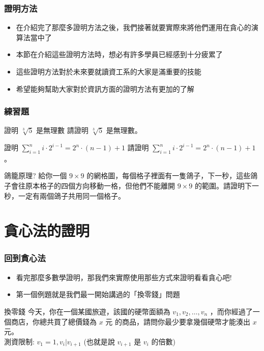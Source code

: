 \documentclass[aspectratio=169]{beamer}
\begin{document}
\begin{frame}
\frametitle{證明方法}
    \begin{itemize}
        \item 在介紹完了那麼多證明方法之後，我們接著就要實際來將他們運用在貪心的演算法當中了
        \item 本節在介紹這些證明方法時，想必有許多學員已經感到十分疲累了
        \item 這些證明方法對於未來要就讀資工系的大家是滿重要的技能
        \item 希望能夠幫助大家對於資訊方面的證明方法有更加的了解
    \end{itemize}
\end{frame}

\begin{frame}
\frametitle{練習題}
    \begin{block}{證明 $\sqrt[3]{5}$ 是無理數}
        請證明 $\sqrt[3]{5}$ 是無理數。
    \end{block}
    
    \begin{block}{證明 $\sum_{i=1}^n i \cdot 2^{i-1} = 2^n \cdot (n-1) + 1$}
        請證明 $\sum_{i=1}^n i \cdot 2^{i-1} = 2^n \cdot (n-1) + 1$。
    \end{block}
    
    \begin{block}{鴿籠原理?}
        給你一個 $9 \times 9$ 的網格圖，每個格子裡面有一隻鴿子，下一秒，這些鴿子會往原本格子的四個方向移動一格，但他們不能離開 $9 \times 9$ 的範圍。請證明下一秒，一定有兩個鴿子共用同一個格子。
    \end{block}
\end{frame}

\section{貪心法的證明}

\begin{frame}
\frametitle{回到貪心法}
    \begin{itemize}
        \item 看完那麼多數學證明，那我們來實際使用那些方式來證明看看貪心吧!
        \item 第一個例題就是我們最一開始講過的「換零錢」問題
    \end{itemize} \pause
    
    \begin{block}{換零錢}
    今天，你在一個某國旅遊，該國的硬幣面額為 $v_1, v_2, \ldots, v_n$ ，而你經過了一個商店，你總共買了總價錢為 $x$ 元 的商品，請問你最少要拿幾個硬幣才能湊出 $x$ 元。 \\
    測資限制: $v_1 = 1, v_i | v_{i+1}$ (也就是說 $v_{i+1}$ 是 $v_i$ 的倍數)
    \end{block}
\end{frame}
\end{document}
